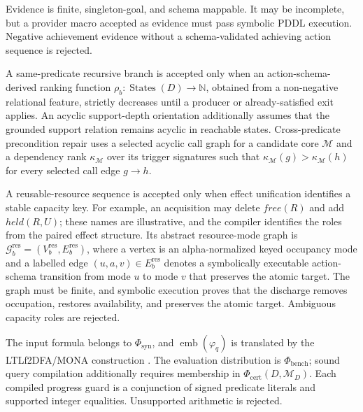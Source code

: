 \begin{assumption}[Evidence]
Evidence is finite, singleton-goal, and schema mappable. It may be incomplete,
but a provider macro accepted as evidence must pass symbolic PDDL execution.
Negative achievement evidence without a schema-validated achieving action
sequence is rejected.
\end{assumption}

\begin{assumption}
A same-predicate recursive branch is accepted only when an action-schema-derived
ranking function $\rho_b:\operatorname{States}(D)\rightarrow\mathbb N$,
obtained from a non-negative relational feature, strictly decreases until a producer or
already-satisfied exit applies. An acyclic support-depth orientation additionally
assumes that the grounded support relation remains acyclic in reachable states.
Cross-predicate precondition repair uses a selected acyclic call graph for a
candidate core $\mathcal M$ and a dependency rank $\kappa_{\mathcal M}$ over
its trigger signatures such that
$\kappa_{\mathcal M}(g)>\kappa_{\mathcal M}(h)$ for every selected call edge
$g\rightarrow h$.
\end{assumption}

\begin{assumption}
A reusable-resource sequence is accepted only when effect unification identifies
a stable capacity key. For example, an acquisition may delete
$\mathit{free}(R)$ and add $\mathit{held}(R,U)$; these names are illustrative,
and the compiler identifies the roles from the paired effect structure. Its
abstract resource-mode graph is
$\mathcal G_b^{\mathrm{res}}=(V_b^{\mathrm{res}},E_b^{\mathrm{res}})$, where a
vertex is an alpha-normalized keyed occupancy mode and a labelled edge
$(u,a,v)\in E_b^{\mathrm{res}}$ denotes a symbolically executable action-schema
transition from mode $u$ to mode $v$ that preserves the atomic target. The graph
must be finite, and symbolic
execution proves that the discharge removes occupation, restores availability,
and preserves the atomic target. Ambiguous capacity roles are rejected.
\end{assumption}

\begin{assumption}
The input formula belongs to $\Phi_{\mathrm{syn}}$, and
$\operatorname{emb}(\varphi_q)$ is translated by the LTLf2DFA/MONA construction
\cite{Fuggitti2020LTLf2DFA,Henriksen1995MONA}. The evaluation distribution is
$\Phi_{\mathrm{bench}}$; sound query compilation additionally requires
membership in $\Phi_{\mathrm{cert}}(D,\mathcal M_D)$. Each compiled progress
guard is a conjunction of signed predicate literals and supported integer
equalities. Unsupported arithmetic is rejected.
\end{assumption}

